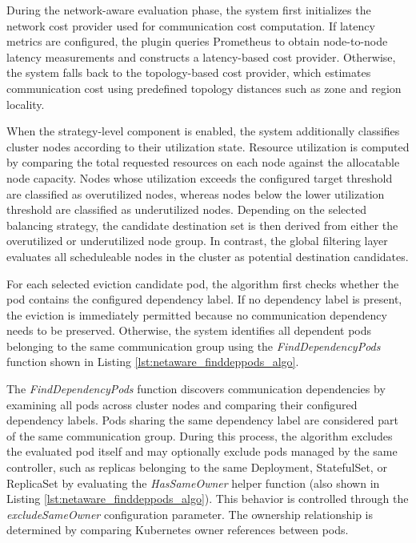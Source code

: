 During the network-aware evaluation phase, the system first initializes the network cost provider used for communication cost computation. If latency metrics are configured, the plugin queries Prometheus to obtain node-to-node latency measurements and constructs a latency-based cost provider. Otherwise, the system falls back to the topology-based cost provider, which estimates communication cost using predefined topology distances such as zone and region locality.

When the strategy-level component is enabled, the system additionally classifies cluster nodes according to their utilization state. Resource utilization is computed by comparing the total requested resources on each node against the allocatable node capacity. Nodes whose utilization exceeds the configured target threshold are classified as overutilized nodes, whereas nodes below the lower utilization threshold are classified as underutilized nodes. Depending on the selected balancing strategy, the candidate destination set is then derived from either the overutilized or underutilized node group. In contrast, the global filtering layer evaluates all scheduleable nodes in the cluster as potential destination candidates.

For each selected eviction candidate pod, the algorithm first checks whether the pod contains the configured dependency label. If no dependency label is present, the eviction is immediately permitted because no communication dependency needs to be preserved. Otherwise, the system identifies all dependent pods belonging to the same communication group using the \textit{FindDependencyPods} function shown in Listing \ref{lst:netaware_finddeppods_algo}.

\begin{figure}[tbp]
    \centering
    \begin{minipage}{0.95\textwidth}
    
    \end{minipage}
\end{figure}

The \textit{FindDependencyPods} function discovers communication dependencies by examining all pods across cluster nodes and comparing their configured dependency labels. Pods sharing the same dependency label are considered part of the same communication group. During this process, the algorithm excludes the evaluated pod itself and may optionally exclude pods managed by the same controller, such as replicas belonging to the same Deployment, StatefulSet, or ReplicaSet by evaluating the \textit{HasSameOwner} helper function (also shown in Listing \ref{lst:netaware_finddeppods_algo}). This behavior is controlled through the \textit{excludeSameOwner} configuration parameter. The ownership relationship is determined by comparing Kubernetes owner references between pods.

